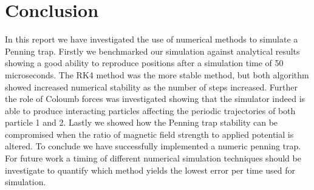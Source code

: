 \documentclass[../main_proj3.tex]{subfiles}
\begin{document}
\section{Conclusion}\label{sec:conclusion}

In this report we have investigated the use of numerical methods to simulate a Penning trap. Firstly we benchmarked our simulation against analytical results showing a good ability to reproduce positions after a simulation time of 50 microseconds. The RK4 method was the more stable method, but both algorithm showed increased numerical stability as the number of steps increased. Further the role of Coloumb forces was investigated showing that the simulator indeed is able to produce interacting particles affecting the periodic trajectories of both particle 1 and 2. Lastly we showed how the Penning trap stability can be compromised when the ratio of magnetic field strength to applied potential is altered. To conclude we have successfully implemented a numeric penning trap. For future work a timing of different numerical simulation techniques should be investigate to quantify which method yields the lowest error per time used for simulation.
\end{document}
